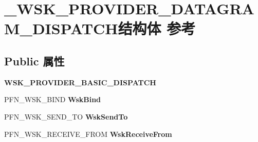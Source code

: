 \hypertarget{struct___w_s_k___p_r_o_v_i_d_e_r___d_a_t_a_g_r_a_m___d_i_s_p_a_t_c_h}{}\section{\+\_\+\+W\+S\+K\+\_\+\+P\+R\+O\+V\+I\+D\+E\+R\+\_\+\+D\+A\+T\+A\+G\+R\+A\+M\+\_\+\+D\+I\+S\+P\+A\+T\+C\+H结构体 参考}
\label{struct___w_s_k___p_r_o_v_i_d_e_r___d_a_t_a_g_r_a_m___d_i_s_p_a_t_c_h}
\subsection*{Public 属性}
\begin{DoxyCompactItemize}
\item 
\mbox{\label{struct___w_s_k___p_r_o_v_i_d_e_r___d_a_t_a_g_r_a_m___d_i_s_p_a_t_c_h_af5d1f58462c258de4e97d201e13f0609}} 
{\bfseries W\+S\+K\+\_\+\+P\+R\+O\+V\+I\+D\+E\+R\+\_\+\+B\+A\+S\+I\+C\+\_\+\+D\+I\+S\+P\+A\+T\+CH}
\item 
\mbox{\label{struct___w_s_k___p_r_o_v_i_d_e_r___d_a_t_a_g_r_a_m___d_i_s_p_a_t_c_h_a977b65e6142f16c30367e7871a9744ac}} 
P\+F\+N\+\_\+\+W\+S\+K\+\_\+\+B\+I\+ND {\bfseries Wsk\+Bind}
\item 
\mbox{\label{struct___w_s_k___p_r_o_v_i_d_e_r___d_a_t_a_g_r_a_m___d_i_s_p_a_t_c_h_a1b55d372bd8fd9454abe2dd3b03a0683}} 
P\+F\+N\+\_\+\+W\+S\+K\+\_\+\+S\+E\+N\+D\+\_\+\+TO {\bfseries Wsk\+Send\+To}
\item 
\mbox{\label{struct___w_s_k___p_r_o_v_i_d_e_r___d_a_t_a_g_r_a_m___d_i_s_p_a_t_c_h_a507a3763500ec5f82a056ec8fb3aa51c}} 
P\+F\+N\+\_\+\+W\+S\+K\+\_\+\+R\+E\+C\+E\+I\+V\+E\+\_\+\+F\+R\+OM {\bfseries Wsk\+Receive\+From}
\item 
\mbox{\label{struct___w_s_k___p_r_o_v_i_d_e_r___d_a_t_a_g_r_a_m___d_i_s_p_a_t_c_h_a157792c8cf0b1145130d7a00926601ca}} 

\end{DoxyCompactItemize}
